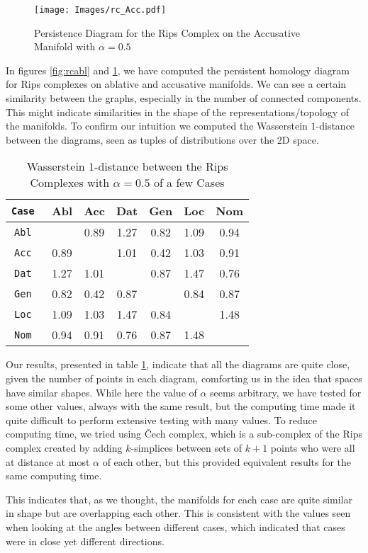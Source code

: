 \begin{figure}[h]
    \centering
    \texttt{[image: Images/rc\_Acc.pdf]}
    \caption{Persistence Diagram for the Rips Complex on the Accusative Manifold with $\alpha = 0.5$}
    \label{fig:rcacc}
\end{figure}

In figures \ref{fig:rcabl} and \ref{fig:rcacc}, we have computed the persistent homology diagram for Rips complexes on ablative and accusative manifolds. 
We can see a certain similarity between the graphs, especially in the number of connected components. 
This might indicate similarities in the shape of the representations/topology of the manifolds. 
To confirm our intuition we computed the Wasserstein $1$-distance between the diagrams, seen as tuples of distributions over the 2D space.

\begin{table}[h]
\centering
\addtolength{\tabcolsep}{-0.4ex}
\begin{tabular}{>{\tt}c|cccccc}
        \toprule
        Case & Abl & Acc & Dat & Gen & Loc & Nom\\
        \midrule
        Abl & \phantom{0.00} & 0.89 & 1.27 & 0.82 & 1.09 & 0.94\\
        Acc & 0.89 & \phantom{0.00} & 1.01 & 0.42 & 1.03 & 0.91\\
        Dat & 1.27 & 1.01 & \phantom{0.00} & 0.87 & 1.47 & 0.76\\
        Gen & 0.82 & 0.42 & 0.87 & \phantom{0.00} & 0.84 & 0.87\\
        Loc & 1.09 & 1.03 & 1.47 & 0.84 & \phantom{0.00} & 1.48\\
        Nom & 0.94 & 0.91 & 0.76 & 0.87 & 1.48 & \phantom{0.00}\\
        \bottomrule
\end{tabular}
\addtolength{\tabcolsep}{0.4ex}
\caption{Wasserstein $1$-distance between the Rips Complexes with $\alpha = 0.5$ of a few Cases}
\label{tab:wassrc}
\end{table}

Our results, presented in table \ref{tab:wassrc}, indicate that all the diagrams are quite close, given the number of points in each diagram, comforting us in the idea that spaces have similar shapes. 
While here the value of $\alpha$ seems arbitrary, we have tested for some other values, always with the same result, but the computing time made it quite difficult to perform extensive testing with many values. 
To reduce computing time, we tried using Čech complex, which is a sub-complex of the Rips complex created by adding $k$-simplices between sets of $k + 1$ points who were all at distance at most $\alpha$ of each other, but this provided equivalent results for the same computing time. 

This indicates that, as we thought, the manifolds for each case are quite similar in shape but are overlapping each other. This is consistent with the values seen when looking at the angles between different cases, which indicated that cases were in close yet different directions.